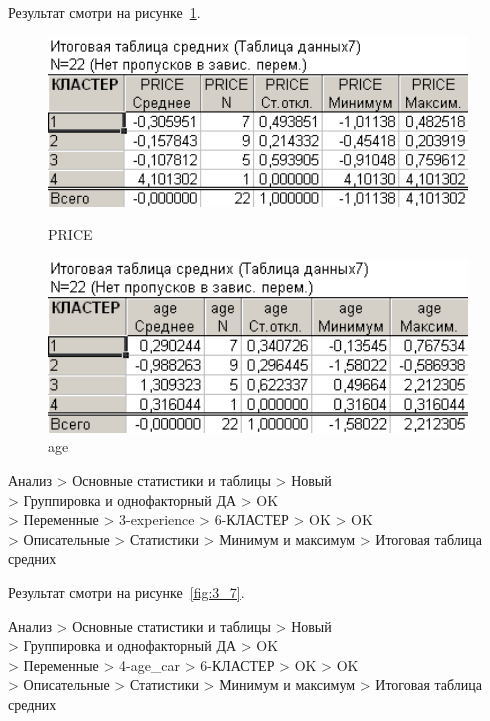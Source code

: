 Результат смотри на рисунке~\ref{fig:3_6}.

\begin{figure}[!h]
  \centering
  \begin{minipage}{0.49\textwidth}
    \centering

    \includegraphics[width=0.99\textwidth]
    {inc/cars_my/3.5.PNG}

    \caption{PRICE}
    \label{fig:3_5}
  \end{minipage}
  \begin{minipage}{0.49\textwidth}
    \centering

    \includegraphics[width=0.99\textwidth]
    {inc/cars_my/3.6.PNG}

    \caption{age}
    \label{fig:3_6}
  \end{minipage}
\end{figure}

Анализ > Основные статистики и таблицы > Новый\\
> Группировка и однофакторный ДА > OK\\
> Переменные > 3-experience > 6-КЛАСТЕР > OK > OK\\
> Описательные > Статистики > Минимум и максимум > Итоговая таблица средних

Результат смотри на рисунке~\ref{fig:3_7}.

Анализ > Основные статистики и таблицы > Новый\\
> Группировка и однофакторный ДА > OK\\
> Переменные > 4-age\_car > 6-КЛАСТЕР > OK > OK\\
> Описательные > Статистики > Минимум и максимум > Итоговая таблица средних

